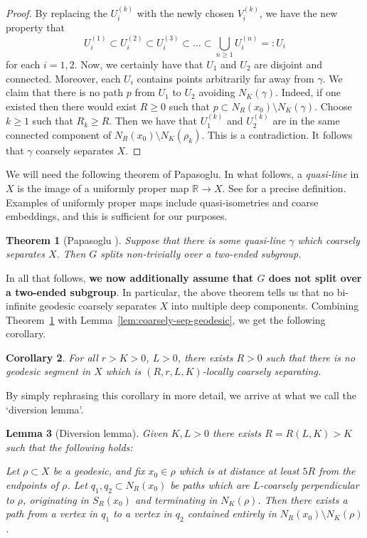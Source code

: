 \documentclass[10pt,a4paper]{amsart}
\newcommand{\R}{\mathbb{R}}
\newtheorem{theorem}{Theorem}[section]
\newtheorem{lemma}[theorem]{Lemma}
\newtheorem{corollary}[theorem]{Corollary}
\theoremstyle{definition}
\begin{document}
\begin{proof}
    By replacing the $U_i^{(k)}$ with the newly chosen $V_i^{(k)}$, we have the new property that 
    $$
    U_i^{(1)} \subset U_i^{(2)} \subset U_i^{(3)} \subset \ldots \subset \bigcup_{n \geq 1} U_i^{(n)} =: U_i  
    $$
    for each $i = 1,2$. Now, we certainly have that $U_1$ and $U_2$ are disjoint and connected. Moreover, each $U_i$ contains points arbitrarily far away from $\gamma$. We claim that there is no path $p$ from $U_1$ to $U_2$ avoiding $N_K(\gamma)$. Indeed, if one existed then there would exist $R \geq 0$ such that  $p \subset N_R(x_0) \setminus N_K(\gamma)$. Choose $k \geq 1$ such that $R_k \geq R$. Then we have that $U_1^{(k)}$ and $U_2^{(k)}$ are in the same connected component of $N_R(x_0) \setminus N_K(\rho_k)$. This is a contradiction. It follows that $\gamma$ coarsely separates $X$. 
\end{proof}



We will need the following theorem of Papasoglu. In what follows, a \textit{quasi-line} in $X$ is the image of a uniformly proper map $\R \to X$. See \cite{papasoglu2005quasi} for a precise definition. Examples of uniformly proper maps include quasi-isometries and coarse embeddings, and this is sufficient for our purposes. 

\begin{theorem}[Papasoglu \cite{papasoglu2005quasi}]\label{thm:papasoglu}
    Suppose that there is some quasi-line $\gamma$ which coarsely separates $X$.  Then $G$ splits non-trivially over a two-ended subgroup. 
\end{theorem}

In all that follows, \textbf{we now additionally assume that $G$ does not split over a two-ended subgroup}. 
In particular, the above theorem tells us that no bi-infinite geodesic coarsely separates $X$ into multiple deep components. 
Combining Theorem~\ref{thm:papasoglu} with Lemma~\ref{lem:coarsely-sep-geodesic}, we get the following corollary. 

\begin{corollary}
    For all $r > K > 0$, $L > 0$, there exists $R > 0$ such that there is no geodesic segment in $X$ which is $(R, r, L , K)$-locally coarsely separating. 
\end{corollary}

By simply rephrasing this corollary in more detail, we arrive at what we call the `diversion lemma'. 

\begin{lemma}[Diversion lemma]\label{lem:diversion}
    Given $K, L > 0$ there exists $R = R(L , K) > K$ such that the following holds: 
    
    Let $\rho \subset X$ be a geodesic, and fix $x_0 \in \rho$ which is at distance at least $5R$ from the endpoints of $\rho$. Let $q_1, q_2 \subset N_R(x_0)$ be  paths which are $L$-coarsely perpendicular to $\rho$, originating in $S_R(x_0)$ and terminating in $N_K(\rho)$. Then there exists a path from a vertex in $q_1$ to a vertex in $q_2$ contained entirely in $N_R(x_0) \setminus N_K(\rho)$. 
\end{lemma}
\end{document}
